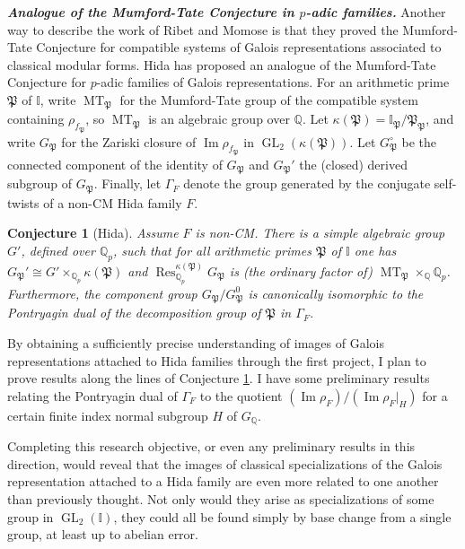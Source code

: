 \documentclass[12pt]{article}
\newcommand{\I}{\mathbb{I}}
\newcommand{\Pp}{\mathfrak{P}}
\newcommand{\Q}{\mathbb{Q}}
\newtheorem{conj}{Conjecture}
\theoremstyle{definition}
\DeclareMathOperator{\GL}{GL}
\DeclareMathOperator{\GSp}{GSp}
\DeclareMathOperator{\im}{Im}
\DeclareMathOperator{\MT}{MT}
\DeclareMathOperator{\Res}{Res}
\DeclareMathOperator{\SL}{SL}
\begin{document}
\textit{\textbf{Analogue of the Mumford-Tate Conjecture in $p$-adic families.}}  Another way to describe the work of Ribet and Momose is that they proved the Mumford-Tate Conjecture for compatible systems of Galois representations associated to classical modular forms.  Hida has proposed an analogue of the Mumford-Tate Conjecture for $p$-adic families of Galois representations.  For an arithmetic prime $\Pp$ of $\I$, write $\MT_\Pp$ for the Mumford-Tate group of the compatible system containing $\rho_{f_\Pp}$, so $\MT_\Pp$ is an algebraic group over $\Q$.  Let $\kappa(\Pp) = \I_\Pp/\Pp_\Pp$, and write $G_\Pp$ for the Zariski closure of $\im \rho_{f_\Pp}$ in $\GL_2(\kappa(\Pp))$.  Let $G_\Pp^\circ$ be the connected component of the identity of $G_\Pp$ and $G_\Pp'$ the (closed) derived subgroup of $G_\Pp$.  Finally, let $\Gamma_F$ denote the group generated by the conjugate self-twists of a non-CM Hida family $F$.

\begin{conj}[Hida]\label{p-adic MT}
Assume $F$ is non-CM.  There is a simple algebraic group $G'$, defined over $\Q_p$, such that for all arithmetic primes $\Pp$ of $\I$ one has $G_\Pp' \cong G' \times_{\Q_p} \kappa(\Pp)$ and $\Res_{\Q_p}^{\kappa(\Pp)} G_\Pp$ is (the ordinary factor of) $\MT_\Pp \times_\Q \Q_p$.  Furthermore, the component group $G_\Pp/G_\Pp^0$ is canonically isomorphic to the Pontryagin dual of the decomposition group of $\Pp$ in $\Gamma_F$.
\end{conj} 

By obtaining a sufficiently precise understanding of images of Galois representations attached to Hida families through the first project, I plan to prove results along the lines of Conjecture \ref{p-adic MT}.  I have some preliminary results relating the Pontryagin dual of $\Gamma_F$ to the quotient $(\im \rho_F)/(\im \rho_F|_H)$ for a certain finite index normal subgroup $H$ of $G_\Q$.

Completing this research objective, or even any preliminary results in this direction, would reveal that the images of classical specializations of the Galois representation attached to a Hida family are even more related to one another than previously thought.  Not only would they arise as specializations of some group in $\GL_2(\I)$, they could all be found simply by base change from a single group, at least up to abelian error.

\end{document}
